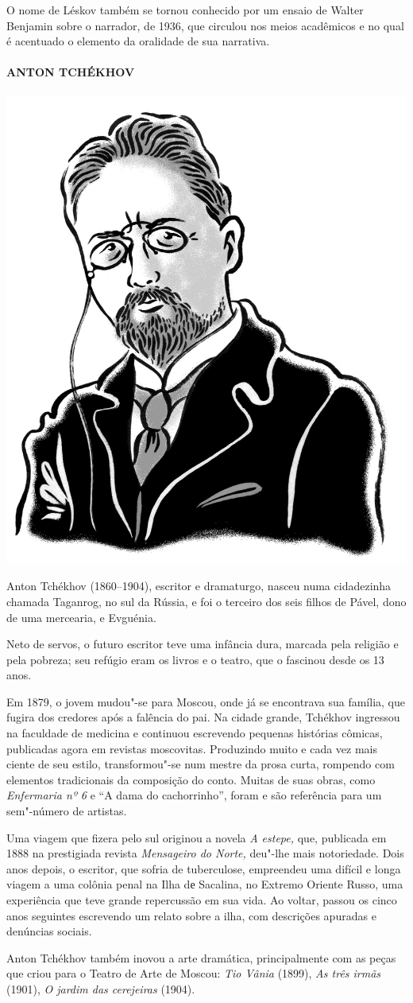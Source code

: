 {O nome de Léskov também se tornou conhecido por um ensaio de Walter
Benjamin sobre o narrador, de 1936, que circulou nos meios acadêmicos e
no qual é acentuado o elemento da oralidade de sua narrativa.

\paragraph{ANTON TCHÉKHOV}

\noindent\includegraphics[width=.8in]{./imgs/autor6.jpg}

\noindent{}Anton Tchékhov (1860--1904), escritor e dramaturgo, nasceu numa
cidadezinha chamada Taganrog, no sul da Rússia, e foi o terceiro dos
seis filhos de Pável, dono de uma mercearia, e Evguénia.

Neto de servos, o futuro escritor teve uma infância dura, marcada pela
religião e pela pobreza; seu refúgio eram os livros e o teatro, que o
fascinou desde os 13 anos.

Em 1879, o jovem mudou"-se para Moscou, onde já se encontrava sua
família, que fugira dos credores após a falência do pai. Na cidade
grande, Tchékhov ingressou na faculdade de medicina e continuou
escrevendo pequenas histórias cômicas, publicadas agora em revistas
moscovitas. Produzindo muito e cada vez mais ciente de seu estilo,
transformou"-se num mestre da prosa curta, rompendo com elementos
tradicionais da composição do conto. Muitas de suas obras, como
\emph{Enfermaria nº 6} e ``A dama do cachorrinho'', foram e são
referência para um sem"-número de artistas.

Uma viagem que fizera pelo sul originou a novela \emph{A estepe,}
que, publicada em 1888 na prestigiada revista \emph{Mensageiro do
Norte,} deu"-lhe mais notoriedade. Dois anos depois, o escritor, que
sofria de tuberculose, empreendeu uma difícil e longa viagem a uma
colônia penal na Ilha dе Sacalina, no Extremo Oriente Russo, uma
experiência que teve grande repercussão em sua vida. Ao voltar, passou
os cinco anos seguintes escrevendo um relato sobre a ilha, com
descrições apuradas e denúncias sociais.

Anton Tchékhov também inovou a arte dramática, principalmente com as
peças que criou para o Teatro de Arte de Moscou: \emph{Tio Vânia}
(1899), \emph{As três irmãs} (1901), \emph{O jardim das cerejeiras}
(1904).

}
